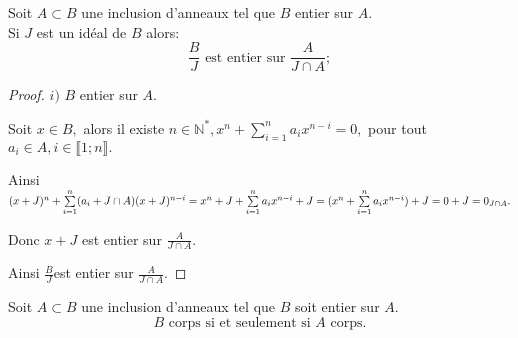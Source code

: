 \begin{maproposition}
	Soit $A \subset B$ une inclusion d'anneaux tel que $B$ entier sur $A$.\\
		Si $J$ est un idéal de $B$ alors:
		\[ \dfrac{B}{J} \text{ est entier sur } \dfrac{A}{J \cap A};\]

\end{maproposition}

\begin{proof}
	$i)$ $B$ entier sur $A.$ 
	
	Soit $x\in B,$ alors il existe $n\in \mathbb{N}^{\ast },x^{n}+\sum\limits_{i=1}^{n}a_{i}x^{n-i}=0,$ pour tout $a_{i}\in	A,i\in \llbracket 1; n \rrbracket.$
	
	Ainsi $(x+J)^{n}+\sum\limits_{i=1}^{n}(a_{i}+J\cap
	A)(x+J)^{n-i}=x^{n}+J+\sum\limits_{i=1}^{n}a_{i}x^{n-i}+J=\\
	(x^{n}+\sum\limits_{i=1}^{n}a_{i}x^{n-i})+J=0+J=0_{J\cap A}.$
	
	Donc $x+J$ est entier sur $\frac{A}{J\cap A}.$
	
	Ainsi $\frac{B}{J}$est entier sur $\frac{A}{J\cap A}.$
	
	
	
%	
%	
%	
%	
%	
\end{proof}
\begin{maproposition}
	Soit $A \subset B$ une inclusion d'anneaux tel que $B$ soit entier sur $A$.
	\[ B \text{ corps} \text{ si et seulement si }  A \text{ corps}.\]
\end{maproposition}
